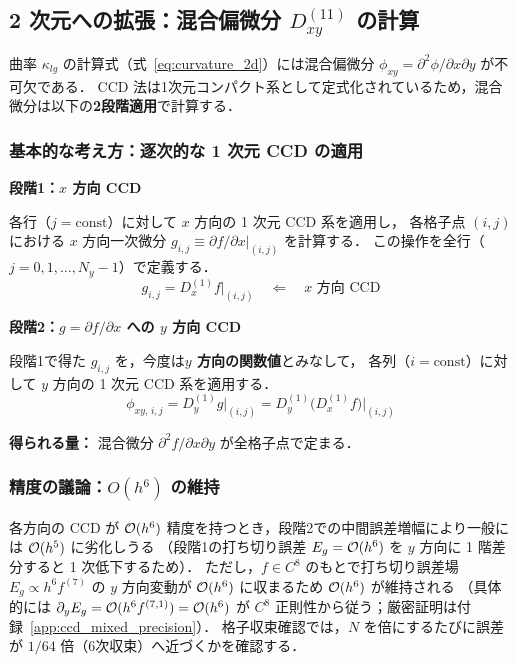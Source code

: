 \subsection{2 次元への拡張：混合偏微分 \texorpdfstring{$D_{xy}^{(11)}$}{Dxy\^{}(11)} の計算}
\label{sec:ccd_mixed}

曲率 $\kappa_{lg}$ の計算式（式~\eqref{eq:curvature_2d}）には混合偏微分 $\phi_{xy} = \partial^2\phi/\partial x\partial y$ が不可欠である．
CCD 法は1次元コンパクト系として定式化されているため，混合微分は以下の\textbf{2段階適用}で計算する．

\subsubsection{基本的な考え方：逐次的な 1 次元 CCD の適用}

\begin{tcolorbox}[resultbox, title={混合微分 $\partial^2 f/\partial x\partial y$ の計算}]
\textbf{段階1：$x$ 方向 CCD}

各行（$j = \text{const}$）に対して $x$ 方向の 1 次元 CCD 系を適用し，
各格子点 $(i,j)$ における $x$ 方向一次微分 $g_{i,j} \equiv \partial f/\partial x \big|_{(i,j)}$ を計算する．
この操作を全行（$j = 0, 1, \ldots, N_y-1$）で定義する．
\[
  g_{i,j} = D_x^{(1)} f \big|_{(i,j)} \quad \Leftarrow \quad x \text{ 方向 CCD}
\]

\textbf{段階2：$g = \partial f/\partial x$ への $y$ 方向 CCD}

段階1で得た $g_{i,j}$ を，今度は\textbf{$y$ 方向の関数値}とみなして，
各列（$i = \text{const}$）に対して $y$ 方向の 1 次元 CCD 系を適用する．
\[
  \phi_{xy,\,i,j} = D_y^{(1)} g \big|_{(i,j)} = D_y^{(1)}\bigl(D_x^{(1)} f\bigr)\big|_{(i,j)}
\]

\textbf{得られる量：} 混合微分 $\partial^2 f/\partial x \partial y$ が全格子点で定まる．
\end{tcolorbox}

\subsubsection{精度の議論：\texorpdfstring{$O(h^6)$}{O(h\textasciicircum 6)} の維持}

各方向の CCD が $\mathcal{O}(h^6)$ 精度を持つとき，段階2での中間誤差増幅により一般には $\mathcal{O}(h^5)$ に劣化しうる
（段階1の打ち切り誤差 $E_g = \mathcal{O}(h^6)$ を $y$ 方向に 1 階差分すると 1 次低下するため）．
ただし，$f \in C^8$ のもとで打ち切り誤差場 $E_g \propto h^6 f^{(7)}$ の $y$ 方向変動が $\mathcal{O}(h^6)$ に収まるため $\mathcal{O}(h^6)$ が維持される
（具体的には $\partial_y E_g = \mathcal{O}(h^6 f^{(7,1)}) = \mathcal{O}(h^6)$ が $C^8$ 正則性から従う；厳密証明は付録~\ref{app:ccd_mixed_precision}）．
格子収束確認では，$N$ を倍にするたびに誤差が $1/64$ 倍（6次収束）へ近づくかを確認する．

